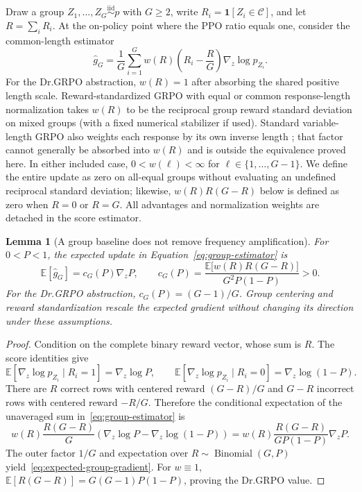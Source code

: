 \documentclass{article}
\newcommand{\enforcehalffinalproseline}{%
  \setlength{\parfillskip}{0pt plus .20\linewidth}}
\newcommand{\1}{\mathbf 1}
\newcommand{\E}{\mathbb E}
\newtheorem{lemma}{Lemma}[section]
\theoremstyle{remark}
\theoremstyle{definition}
\theoremstyle{plain}
\begin{document}
Draw a group $Z_1,\ldots,Z_G\stackrel{\mathrm{iid}}{\sim}p$ with $G\ge2$,
write $R_i=\1[Z_i\in\mathcal C]$, and let $R=\sum_iR_i$. At the on-policy
point where the PPO ratio equals one, consider the common-length estimator
\begin{equation}
  \widehat g_G
  =\frac1G\sum_{i=1}^G
   w(R)\left(R_i-\frac{R}{G}\right)\nabla_z\log p_{Z_i}.
  \label{eq:group-estimator}
\end{equation}
For the Dr.GRPO abstraction, $w(R)=1$ after absorbing the shared positive
length scale. Reward-standardized GRPO with equal or common response-length
normalization takes $w(R)$ to be the reciprocal group reward standard
deviation on mixed groups (with a fixed numerical stabilizer if used).
Standard variable-length GRPO also weights each response by its own inverse
length \citep{shao2024deepseekmath,liu2025understanding}; that factor cannot
generally be absorbed into $w(R)$ and is outside the equivalence proved here.
In either included case, $0<w(\ell)<\infty$ for
$\ell\in\{1,\ldots,G-1\}$. We define the entire update as zero on all-equal
groups without evaluating an undefined reciprocal standard deviation;
likewise, $w(R)R(G-R)$ below is defined as zero when $R=0$ or $R=G$. All
advantages and normalization weights are detached in the score estimator.

\begin{lemma}[A group baseline does not remove frequency amplification]
\enforcehalffinalproseline
\label{lem:grpo-mean}
For $0<P<1$, the expected update in Equation~\eqref{eq:group-estimator} is
\begin{equation}
  \E[\widehat g_G]
  =c_G(P)\nabla_z P,
  \qquad
  c_G(P)=
  \frac{\E\!\big[w(R)R(G-R)\big]}{G^2P(1-P)}>0.
  \label{eq:expected-group-gradient}
\end{equation}
For the Dr.GRPO abstraction, $c_G(P)=(G-1)/G$. Group centering and reward
standardization rescale the expected gradient without changing its direction
under these assumptions.
\end{lemma}

\begin{proof}
\enforcehalffinalproseline
Condition on the complete binary reward vector, whose sum is $R$. The score
identities give
\[
  \E[\nabla_z\log p_{Z_i}\mid R_i=1]=\nabla_z\log P,
  \qquad
  \E[\nabla_z\log p_{Z_i}\mid R_i=0]
  =\nabla_z\log(1-P).
\]
There are $R$ correct rows with centered reward $(G-R)/G$ and $G-R$
incorrect rows with centered reward $-R/G$. Therefore the conditional
expectation of the unaveraged sum in~\eqref{eq:group-estimator} is
\[
  w(R)\frac{R(G-R)}{G}
  \left(\nabla_z\log P-\nabla_z\log(1-P)\right)
  =w(R)\frac{R(G-R)}{GP(1-P)}\nabla_zP.
\]
The outer factor $1/G$ and expectation over
$R\sim\operatorname{Binomial}(G,P)$ yield~\eqref{eq:expected-group-gradient}.
For $w\equiv1$,
$\E[R(G-R)]=G(G-1)P(1-P)$, proving the Dr.GRPO value.
\end{proof}
\end{document}
